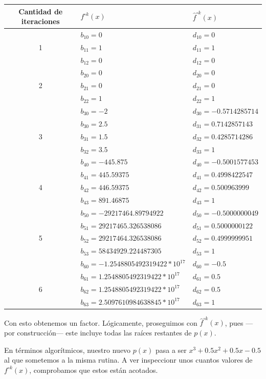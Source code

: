 \documentclass[oneside,11pt]{book}
\theoremstyle{definition}
\theoremstyle{plain}
\theoremstyle{remark}
\begin{document}
\begin{center}
\begin{tabular}{ |c | l | l | }
\hline
 Cantidad de iteraciones & $f^{\circ k}(x)$ & $\hat{f}^{\circ k}(x)$\\
 \hline 
& $b_{10}= 0$ & $d_{10}= 0 $\\
1 & $b_{11}= 1$ &$d_{11}=1 $  \\ 
& $b_{12}= 0$ & $d_{12}=0$\\  
 \hline 
& $b_{20}= 0$ & $d_{20}= 0 $\\
2 & $b_{21}= 0$ & $d_{21}=0 $  \\ 
& $b_{22}= 1$ & $d_{22}=1$\\
\hline
& $b_{30}= -2$ & $d_{30}= -0.5714285714$\\
& $b_{30}= 2.5$ & $d_{31}= 0.7142857143$\\
3 & $b_{31}= 1.5$ & $d_{32}=0.4285714286$  \\ 
& $b_{32}= 3.5$ & $d_{33}=1$\\
\hline
& $b_{40}= -445.875$ & $d_{40}= -0.5001577453$\\
& $b_{41}= 445.59375$ & $d_{41}= 0.4998422547$\\
4 & $b_{42}= 446.59375$ & $d_{42}=0.500963999$  \\ 
& $b_{43}= 891.46875$ & $d_{43}=1$\\
\hline
& $b_{50}= -29217464.89794922$ & $d_{50}=-0.5000000049$\\
& $b_{51}= 29217465.326538086$ & $d_{51}=0.5000000122$\\
5 & $b_{52}= 29217464.326538086$ & $d_{52}=0.4999999951$  \\ 
& $b_{53}= 58434929.224487305$ & $d_{53}=1$\\
\hline
& $b_{60}= -1.2548805492319422*10^{17}$ & $d_{60}=-0.5$\\
& $b_{61}= 1.2548805492319422*10^{17}$ & $d_{61}=0.5$\\
6 & $b_{62}= 1.2548805492319422*10^{17}$ & $d_{62}=0.5$  \\ 
& $b_{63}= 2.5097610984638845*10^{17}$ & $d_{63}=1$\\
\hline
\end{tabular}
\end{center}
\bigskip

Con esto obtenemos un factor. 
L\'ogicamente, proseguimos con $\hat{f}^{\circ k}(x)$, pues ---por construcci\'on--- 
este incluye todas las ra\'ices restantes de $p(x)$. 

En t\'erminos algor\'itmicos, nuestro nuevo $p(x)$ pasa a ser $x^3+0.5x^2+0.5x-0.5$ 
al que sometemos a la misma rutina. 
A ver inspeccionr unos  cuantos valores de $f^{\circ k}(x)$, 
comprobamos que estos est\'an acotados.
\end{document}
